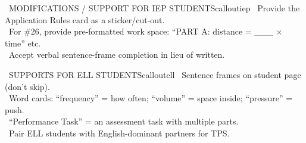\documentclass[11pt]{article}
\begin{document}
\begin{callout}{\IconPuzzle\ MODIFICATIONS / SUPPORT FOR IEP STUDENTS}{calloutiep}
\textbullet\ Provide the Application Rules card as a sticker/cut-out.\\
\textbullet\ For \#26, provide pre-formatted work space: “PART A: distance = \_\_\_ \(\times\) time” etc.\\
\textbullet\ Accept verbal sentence-frame completion in lieu of written.
\end{callout}

\begin{callout}{\IconGlobe\ SUPPORTS FOR ELL STUDENTS}{calloutell}
\textbullet\ Sentence frames on student page (don't skip).\\
\textbullet\ Word cards: “frequency” = how often; “volume” = space inside; “pressure” = push.\\
\textbullet\ “Performance Task” = an assessment task with multiple parts.\\
\textbullet\ Pair ELL students with English-dominant partners for TPS.
\end{callout}
\end{document}
